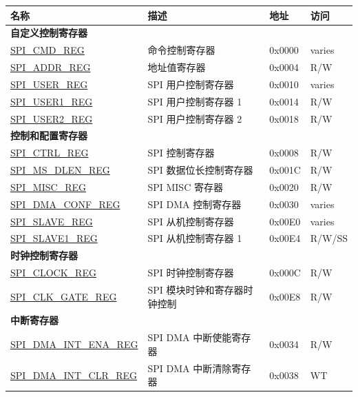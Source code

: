 \begin{longtable}{ | p{5.5cm} | p{7.2cm} | p{1.3cm} | p{1.5cm} | }
\hline\rowcolor{lightgray}
\textbf{名称} & \textbf{描述} &  \textbf{地址} & \textbf{访问} \\ \hline
\endhead
\multicolumn{4}{|l|}{\textbf{自定义控制寄存器}} \\ \hline
\hyperref[regdesc:SPICMDREG]{SPI\_CMD\_REG} & 命令控制寄存器 & 0x0000 & varies \\ \hline
\hyperref[regdesc:SPIADDRREG]{SPI\_ADDR\_REG} & 地址值寄存器 & 0x0004 & R/W \\ \hline
\hyperref[regdesc:SPIUSERREG]{SPI\_USER\_REG} & SPI 用户控制寄存器 & 0x0010 & varies \\ \hline
\hyperref[regdesc:SPIUSER1REG]{SPI\_USER1\_REG} & SPI 用户控制寄存器 1 & 0x0014 & R/W \\ \hline
\hyperref[regdesc:SPIUSER2REG]{SPI\_USER2\_REG} & SPI 用户控制寄存器 2 & 0x0018 & R/W \\ \hline
\multicolumn{4}{|l|}{\textbf{控制和配置寄存器}} \\ \hline
\hyperref[regdesc:SPICTRLREG]{SPI\_CTRL\_REG} & SPI 控制寄存器 & 0x0008 & R/W \\ \hline
\hyperref[regdesc:SPIMSDLENREG]{SPI\_MS\_DLEN\_REG} & SPI 数据位长控制寄存器 & 0x001C & R/W \\ \hline
\hyperref[regdesc:SPIMISCREG]{SPI\_MISC\_REG} & SPI MISC 寄存器 & 0x0020 & R/W \\ \hline
\hyperref[regdesc:SPIDMACONFREG]{SPI\_DMA\_CONF\_REG} & SPI DMA 控制寄存器 & 0x0030 & varies \\ \hline
\hyperref[regdesc:SPISLAVEREG]{SPI\_SLAVE\_REG} & SPI 从机控制寄存器 & 0x00E0 & varies \\ \hline
\hyperref[regdesc:SPISLAVE1REG]{SPI\_SLAVE1\_REG} & SPI 从机控制寄存器 1 & 0x00E4 & R/W/SS \\ \hline
\multicolumn{4}{|l|}{\textbf{时钟控制寄存器}} \\ \hline
\hyperref[regdesc:SPICLOCKREG]{SPI\_CLOCK\_REG} & SPI 时钟控制寄存器 & 0x000C & R/W \\ \hline
\hyperref[regdesc:SPICLKGATEREG]{SPI\_CLK\_GATE\_REG} & SPI 模块时钟和寄存器时钟控制 & 0x00E8 & R/W \\ \hline
\multicolumn{4}{|l|}{\textbf{中断寄存器}} \\ \hline
\hyperref[regdesc:SPIDMAINTENAREG]{SPI\_DMA\_INT\_ENA\_REG} & SPI DMA 中断使能寄存器 & 0x0034 & R/W \\ \hline
\hyperref[regdesc:SPIDMAINTCLRREG]{SPI\_DMA\_INT\_CLR\_REG} & SPI DMA 中断清除寄存器 & 0x0038 & WT \\ \hline

\end{longtable}
